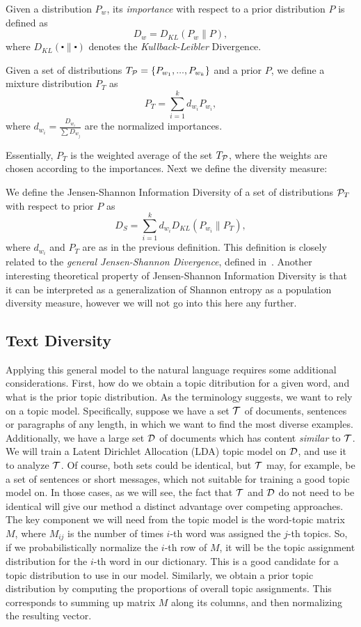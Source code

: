 \documentclass{article} %
\begin{document}
\bed
Given a distribution $P_w$, its {\sl importance} with respect to a
prior distribution $P$ is defined as 
\[D_w = D_{KL}(P_w\|P),\]
where $D_{KL}(\centerdot\|\centerdot)$ denotes the
{\sl Kullback-Leibler} Divergence.
\eed

\bed\label{mixture}
Given a set of distributions $T_{{\mathcal P}}=\{P_{w_1},...,P_{w_k}\}$ and a
prior $P$, we
define a mixture distribution $P_T$ as
\[P_T=\sum_{i=1}^k d_{w_i} P_{w_i},\]
where $d_{w_i}=\frac{D_{w_i}}{\sum D_{w_j}}$ are the normalized
importances.
\eed

Essentially, $P_T$ is the weighted average of the set $T_{{\mathcal P}}$, where
the weights are chosen according to the importances. Next we
define the diversity measure:

\bed\label{diversity}
We define the Jensen-Shannon Information Diversity of a set of
distributions ${\mathcal P}_T$ with respect to 
prior $P$ as
\[D_S=\sum_{i=1}^k d_{w_i}D_{KL}(P_{w_i}\|P_T), \]
where $d_{w_i}$ and $P_T$ are as in the previous definition.
\eed
This definition is closely related to the 
{\em general Jensen-Shannon Divergence}, defined in~\cite{FugledeTopsoe}. Another
interesting theoretical property of Jensen-Shannon Information
Diversity is that it can be interpreted as a generalization of Shannon
entropy as a population diversity measure, however we will not go
into this here any further. 


\subsection{Text Diversity}
\label{sec:text-diversity}

 Applying this general model to the natural language requires some
 additional considerations. First, how do we obtain a topic
 ditribution for a given word, and what is the prior topic
 distribution. As the terminology suggests, we want to rely on a topic
 model. Specifically, suppose we have a set ${\mathcal T}$ of documents, sentences or
 paragraphs of any length, in which we want to find the most diverse
 examples. Additionally, we have a large set ${\mathcal D}$ of documents which
 has content {\em similar} to ${\mathcal T}$. We will train a Latent Dirichlet
 Allocation (LDA) topic model on ${\mathcal D}$, 
 and use it to analyze ${\mathcal T}$. Of course, both sets could be identical,
 but ${\mathcal T}$ may, for example, be a set of sentences or short messages,
which not suitable for training a good topic model on. In those cases,
as we will see, the fact that ${\mathcal T}$ and ${\mathcal D}$ do not 
 need to be identical will give our method a distinct advantage over
 competing approaches. The key component we will need from the topic
 model is the word-topic matrix $M$, where $M_{ij}$ is the number of
 times $i$-th word was assigned the $j$-th topics. So, if we
 probabilistically normalize
 the $i$-th row of $M$, it will be the topic assignment distribution
 for the $i$-th word in our dictionary. This is a good candidate for a
 topic distribution to use in our model. Similarly, we obtain a prior
 topic distribution by computing the proportions of overall topic
 assignments. This corresponds to summing up matrix $M$ along its
 columns, and then normalizing the resulting vector.
\end{document}
